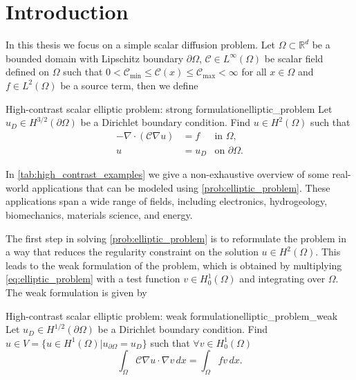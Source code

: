 \chapter{Introduction}\label{ch:introduction}
In this thesis we focus on a simple scalar diffusion problem. Let $\Omega\subset\mathbb{R}^d$ be a bounded domain with Lipschitz boundary $\partial\Omega$, $\mathcal{C}\in L^\infty(\Omega)$ be scalar field defined on $\Omega$ such that $0 < \mathcal{C}_{\min} \leq \mathcal{C}(x) \leq \mathcal{C}_{\max} < \infty$ for all $x\in\Omega$ and $f\in L^2(\Omega)$ be a source term, then we define
\begin{fancyprob}{High-contrast scalar elliptic problem: strong formulation}{elliptic_problem}
    Let $u_D\in H^{3/2}(\partial\Omega)$ be a Dirichlet boundary condition. Find $u\in H^2(\Omega)$ such that
    \begin{equation}
        \begin{aligned}
            -\nabla\cdot\left(\mathcal{C}\nabla u\right) & = f &\text{in } \Omega,           \\
            u                                       & = u_D &\text{on } \partial\Omega.
        \end{aligned}
        \label{eq:elliptic_problem}
    \end{equation}
\end{fancyprob}

In \cref{tab:high_contrast_examples} we give a non-exhaustive overview of some real-world applications that can be modeled using \cref{prob:elliptic_problem}. These applications span a wide range of fields, including electronics, hydrogeology, biomechanics, materials science, and energy.


The first step in solving \cref{prob:elliptic_problem} is to reformulate the problem in a way that reduces the regularity constraint on the solution $u\in H^2(\Omega)$. This leads to the weak formulation of the problem, which is obtained by multiplying \cref{eq:elliptic_problem} with a test function $v\in H^1_0(\Omega)$ and integrating over $\Omega$. The weak formulation is given by
\begin{fancyprob}{High-contrast scalar elliptic problem: weak formulation}{elliptic_problem_weak}
    Let $u_D\in H^{1/2}(\partial\Omega)$ be a Dirichlet boundary condition. Find $u\in V = \{u\in H^1(\Omega) | u_{\partial \Omega} = u_D\}$ such that $\forall v \in H^1_0(\Omega)$
    \begin{equation}
        \label{eq:galerkin}
        \int_\Omega \mathcal{C}\nabla u\cdot\nabla v\,dx = \int_\Omega f v\,dx.
    \end{equation}
\end{fancyprob}

